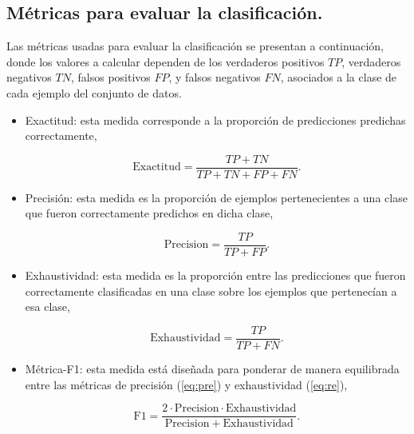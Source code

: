 \subsection{Métricas para evaluar la clasificación.}
Las métricas usadas para evaluar la clasificación se presentan a continuación, donde los valores a calcular dependen de los verdaderos positivos $TP$, verdaderos negativos $TN$, falsos positivos $FP$, y falsos negativos $FN$, asociados a la clase de cada ejemplo del conjunto de datos.


\begin{itemize}
    \item Exactitud: esta medida corresponde a la proporción de predicciones predichas correctamente,

    \begin{equation}
        \mathrm{Exactitud}= \frac{TP+TN}{TP+TN+FP+FN}.
        \label{eq:acc}
    \end{equation}


    \item Precisión: esta medida es la proporción de ejemplos pertenecientes a una clase que fueron correctamente predichos en dicha clase,
    
        \begin{equation}
            \mathrm{Precision} = \frac{TP}{TP+FP}.
            \label{eq:pre}
        \end{equation}
        
    \item Exhaustividad: esta medida es la proporción entre las predicciones que fueron correctamente clasificadas en una clase sobre los ejemplos que pertenecían a esa clase,
    
    \begin{equation}
        \mathrm{Exhaustividad}= \frac{TP}{TP+FN}.
        \label{eq:re}
    \end{equation}

    \item Métrica-F1: esta medida está diseñada para ponderar de manera equilibrada entre las métricas de precisión (\ref{eq:pre}) y exhaustividad (\ref{eq:re}),
    
    \begin{equation}
        \mathrm{F1} = \frac{2\cdot\mathrm{Precision}\cdot\mathrm{Exhaustividad}}{\mathrm{Precision}+\mathrm{Exhaustividad}}.
        \label{eq:f1}
    \end{equation}

\end{itemize}

